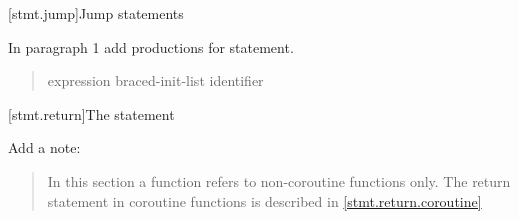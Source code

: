\setcounter{section}{5}
[stmt.jump]{Jump statements}%

In paragraph 1 add productions for  statement.

\begin{quote}
\begin{bnf}
	\br
	\br
	\br
	 expression\opt \terminal{;}\br
	 braced-init-list \terminal{;}\br
	\br
	\br
	 identifier \terminal{;}
\end{bnf}
\end{quote}

\setcounter{subsection}{2}
[stmt.return]{The  statement}%
%
%

Add a note:

\begin{quote}
\enternote
In this section a function refers to non-coroutine functions only.
The return statement in coroutine functions is described in \ref{stmt.return.coroutine}
\exitnote
\end{quote}


